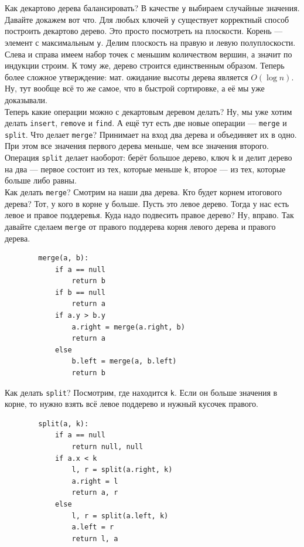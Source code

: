 \documentclass{article}
\newcommand{\pseudo}{PseudoLexer.py:PseudoLexer -x}
\newcommand{\pseudocode}[1]{\texttt{#1}}
\begin{document}
    Как декартово дерева балансировать? В качестве \pseudocode{y} выбираем случайные значения. Давайте докажем вот что. Для любых ключей \pseudocode{y} существует корректный способ построить декартово дерево. Это просто посмотреть на плоскости. Корень --- элемент с максимальным \pseudocode{y}. Делим плоскость на правую и левую полуплоскости. Слева и справа имеем набор точек с меньшим количеством вершин, а значит по индукции строим. К тому же, дерево строится единственным образом. Теперь более сложное утверждение: мат. ожидание высоты дерева является $O(\log n)$. Ну, тут вообще всё то же самое, что в быстрой сортировке, а её мы уже доказывали.\\
    Теперь какие операции можно с декартовым деревом делать? Ну, мы уже хотим делать \pseudocode{insert}, \pseudocode{remove} и \pseudocode{find}. А ещё тут есть две новые операции --- \pseudocode{merge} и \pseudocode{split}. Что делает \pseudocode{merge}? Принимает на вход два дерева и объединяет их в одно. При этом все значения первого дерева меньше, чем все значения второго. Операция \pseudocode{split} делает наоборот: берёт большое дерево, ключ \pseudocode{k} и делит дерево на два --- первое состоит из тех, которые меньше \pseudocode{k}, второе --- из тех, которые больше либо равны.\\
    Как делать \pseudocode{merge}? Смотрим на наши два дерева. Кто будет корнем итогового дерева? Тот, у кого в корне \pseudocode{y} больше. Пусть это левое дерево. Тогда у нас есть левое и правое поддеревья. Куда надо подвесить правое дерево? Ну, вправо. Так давайте сделаем \pseudocode{merge} от правого поддерева корня левого дерева и правого дерева.
    \begin{verbatim}
        merge(a, b):
            if a == null
                return b
            if b == null
                return a
            if a.y > b.y
                a.right = merge(a.right, b)
                return a
            else
                b.left = merge(a, b.left)
                return b
    \end{verbatim}
    Как делать \pseudocode{split}? Посмотрим, где находится \pseudocode{k}. Если он больше значения в корне, то нужно взять всё левое поддерево и нужный кусочек правого.
    \begin{verbatim}
        split(a, k):
            if a == null
                return null, null
            if a.x < k
                l, r = split(a.right, k)
                a.right = l
                return a, r
            else
                l, r = split(a.left, k)
                a.left = r
                return l, a
    \end{verbatim}
\end{document}
